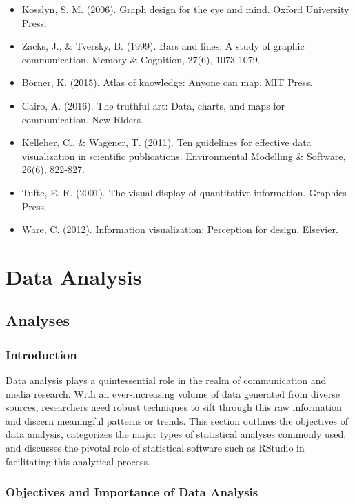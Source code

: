 \documentclass[
  b5paper]{book}
\begin{document}
\begin{itemize}
\item
  Kosslyn, S. M. (2006). Graph design for the eye and mind. Oxford University Press.
\item
  Zacks, J., \& Tversky, B. (1999). Bars and lines: A study of graphic communication. Memory \& Cognition, 27(6), 1073-1079.
\item
  Börner, K. (2015). Atlas of knowledge: Anyone can map. MIT Press.
\item
  Cairo, A. (2016). The truthful art: Data, charts, and maps for communication. New Riders.
\item
  Kelleher, C., \& Wagener, T. (2011). Ten guidelines for effective data visualization in scientific publications. Environmental Modelling \& Software, 26(6), 822-827.
\item
  Tufte, E. R. (2001). The visual display of quantitative information. Graphics Press.
\item
  Ware, C. (2012). Information visualization: Perception for design. Elsevier.
\end{itemize}

\hypertarget{data-analysis}{%
\chapter{Data Analysis}\label{data-analysis}}

\hypertarget{analyses-1}{%
\section{Analyses}\label{analyses-1}}

\hypertarget{introduction-7}{%
\subsection{Introduction}\label{introduction-7}}

Data analysis plays a quintessential role in the realm of communication and media research. With an ever-increasing volume of data generated from diverse sources, researchers need robust techniques to sift through this raw information and discern meaningful patterns or trends. This section outlines the objectives of data analysis, categorizes the major types of statistical analyses commonly used, and discusses the pivotal role of statistical software such as RStudio in facilitating this analytical process.

\hypertarget{objectives-and-importance-of-data-analysis}{%
\subsection{Objectives and Importance of Data Analysis}\label{objectives-and-importance-of-data-analysis}}
\end{document}
